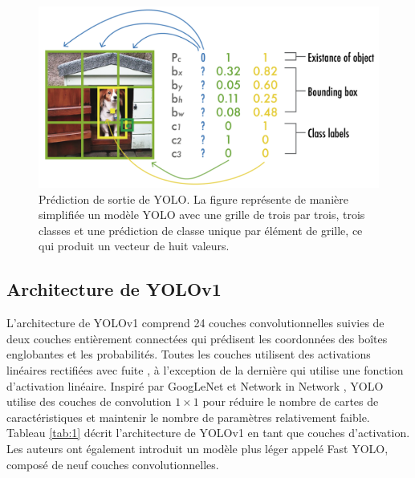 \documentclass{article}
\begin{document}
\begin{figure}[htbp]
    \centering
    \includegraphics[scale=0.22]{Figures/Output.png}
    \caption{Prédiction de sortie de YOLO. La figure représente de manière simplifiée un modèle YOLO avec une grille de trois par trois, trois classes et une prédiction de classe unique par élément de grille, ce qui produit un vecteur de huit valeurs.}
    \label{fig:Output}
\end{figure}
\vspace{0.6cm}

\subsection{Architecture de YOLOv1}

L'architecture de YOLOv1 comprend 24 couches convolutionnelles suivies de deux couches entièrement connectées qui prédisent les coordonnées des boîtes englobantes et les probabilités. Toutes les couches utilisent des activations linéaires rectifiées avec fuite \cite{40}, à l'exception de la dernière qui utilise une fonction d'activation linéaire. Inspiré par GoogLeNet \cite{41} et Network in Network \cite{42}, YOLO utilise des couches de convolution $1\times 1$ pour réduire le nombre de cartes de caractéristiques et maintenir le nombre de paramètres relativement faible. Tableau \ref{tab:1} décrit l'architecture de YOLOv1 en tant que couches d'activation. Les auteurs ont également introduit un modèle plus léger appelé Fast YOLO, composé de neuf couches convolutionnelles.
\end{document}
